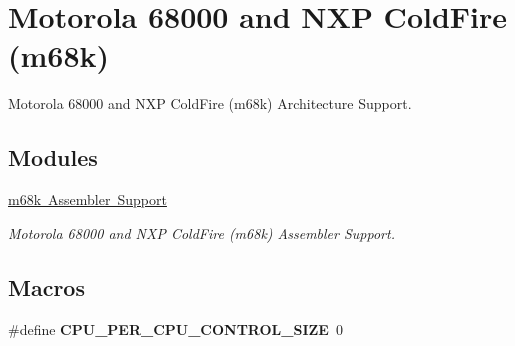 \hypertarget{group__RTEMSScoreCPUm68k}{}\section{Motorola 68000 and N\+XP Cold\+Fire (m68k)}
\label{group__RTEMSScoreCPUm68k}


Motorola 68000 and N\+XP Cold\+Fire (m68k) Architecture Support.  


\subsection*{Modules}
\begin{DoxyCompactItemize}
\item 
\mbox{\hyperlink{group__RTEMSScoreCPUm68kASM}{m68k Assembler Support}}
\begin{DoxyCompactList}\small\item\em Motorola 68000 and N\+XP Cold\+Fire (m68k) Assembler Support. \end{DoxyCompactList}\end{DoxyCompactItemize}
\subsection*{Macros}
\begin{DoxyCompactItemize}
\item 
\mbox{\label{group__RTEMSScoreCPUm68k_gaf8e38596ad3db49995fd8eb9fb4e86b2}} 
\#define {\bfseries C\+P\+U\+\_\+\+P\+E\+R\+\_\+\+C\+P\+U\+\_\+\+C\+O\+N\+T\+R\+O\+L\+\_\+\+S\+I\+ZE}~0
\end{DoxyCompactItemize}

